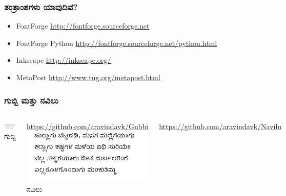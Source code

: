 \documentclass[16pt]{beamer}
\newcommand\en[1]{{\english #1}}
\begin{document}
\begin{spacing}{1.6}
  \begin{frame}
    \frametitle{ತಂತ್ರಾಂಶಗಳು ಯಾವುದಿವೆ?}
    \begin{itemize}
    \item \en{FontForge} \url{http://fontforge.sourceforge.net}
    \item \en{FontForge Python} \url{http://fontforge.sourceforge.net/python.html}
    \item \en{Inkscape} \url{http://inkscape.org/}
    \item \en{MetaPost} \url{http://www.tug.org/metapost.html}
    \end{itemize}
  \end{frame}

  \begin{frame}
    \frametitle{ಗುಬ್ಬಿ ಮತ್ತು ನವಿಲು}
    \begin{columns}[t]
      \column{5cm}
      \includegraphics[width=\textwidth]{images/gubbi-showcase.png} \\
      \LARGE{ಗುಬ್ಬಿ}

      \normalsize \url{https://github.com/aravindavk/Gubbi}
      \column{5cm}
      \includegraphics[width=\textwidth]{images/navilu-showcase.png} \\
      \LARGE{ನವಿಲು}

      \normalsize \url{https://github.com/aravindavk/Navilu}
    \end{columns}
  \end{frame}


\end{spacing}
\end{document}
